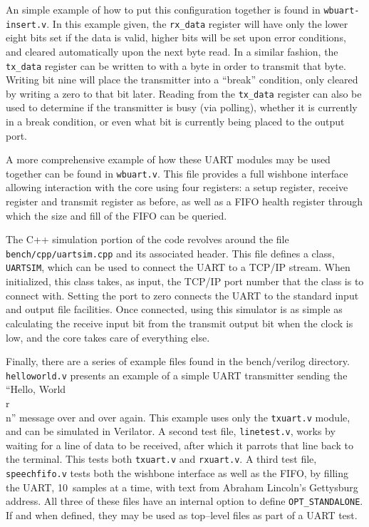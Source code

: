 \documentclass{gqtekspec}
\begin{document}
An simple example of how to put this configuration together is found in
{\tt wbuart-insert.v}.  In this example given, the {\tt rx\_data} register
will have only the lower eight bits set if the data is valid, higher bits will
be set upon error conditions, and cleared automatically upon the next byte read.
In a similar fashion, the {\tt tx\_data} register can be written to with a byte
in order to transmit that byte.  Writing bit nine will place the transmitter
into a ``break'' condition, only cleared by writing a zero to that bit later.
Reading from the {\tt tx\_data} register can also be used to determine if the
transmitter is busy (via polling), whether it is currently in a break condition,
or even what bit is currently being placed to the output port.

A more comprehensive example of how these UART modules may be used together
can be found in {\tt wbuart.v}.  This file provides a full wishbone interface
allowing interaction with the core using four registers: a setup register,
receive register and transmit register as before, as well as a FIFO health
register through which the size and fill of the FIFO can be queried.

The C++ simulation portion of the code revolves around the file
{\tt bench/cpp/uartsim.cpp} and its associated header.  This file defines a 
class, {\tt UARTSIM}, which can be used to connect the UART to a TCP/IP stream.
When initialized, this class takes, as input, the TCP/IP port number that the
class is to connect with.  Setting the port to zero connects the UART to
the standard input and output file facilities.  Once connected, using this
simulator is as simple as calculating the receive input bit from the transmit
output bit when the clock is low, and the core takes care of everything else.

Finally, there are a series of example files found in the bench/verilog
directory.  {\tt helloworld.v} presents an example of a simple UART transmitter
sending the ``Hello, World \\r\\n'' message over and over again.  This example
uses only the {\tt txuart.v} module, and can be simulated in Verilator.
A second test file, {\tt linetest.v}, works by waiting for a line of data to be
received, after which it parrots that line back to the terminal.  This tests
both {\tt txuart.v} and {\tt rxuart.v}.  A third test file, {\tt speechfifo.v}
tests both the wishbone interface as well as the FIFO, by filling the UART,
10~samples at a time, with text from Abraham Lincoln's Gettysburg address.
All three of these files have an internal option to define
{\tt OPT\_STANDALONE}.  If and when defined, they may be used as top--level
files as part of a UART test.
\end{document}
